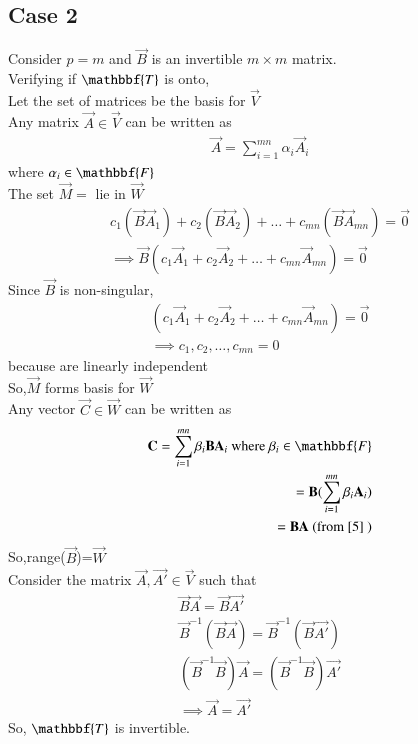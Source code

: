 \documentclass[journal,12pt,twocolumn]{IEEEtran}
\begin{document}
\subsection{Case 2}
 Consider $p=m$ and $\vec{B}$ is an invertible $m \times m$ matrix.\\
Verifying if $\mathbbf{T}$ is onto,\\
Let the set of matrices  be the basis for $\vec{V}$\\
Any matrix $\vec{A} \in \vec{V}$ can be written as
\begin{align}
   \vec{A}= \sum_{i=1}^{mn} \alpha_i\vec{A}_i\label{5}
\end{align}
where $\alpha_i \in \mathbbf{F}$\\
The set $\vec{M}= $  lie in $\vec{W}$
\begin{align}
    c_1(\vec{B}\vec{A}_1)+c_2(\vec{B}\vec{A}_2)+\hdots+c_{mn}(\vec{B}\vec{A}_{mn})=\vec{0}\\
    \implies \vec{B}(c_1\vec{A}_1+c_2\vec{A}_2+\hdots+c_{mn}\vec{A}_{mn})=\vec{0}
\end{align}
Since $\vec{B}$ is non-singular,
\begin{align}
    (c_1\vec{A}_1+c_2\vec{A}_2+\hdots+c_{mn}\vec{A}_{mn})=\vec{0}\\
    \implies c_1,c_2,\hdots,c_{mn}=0
\end{align}
because  are linearly independent\\
So,$\vec{M}$ forms basis for $\vec{W}$\\
Any vector $\vec{C} \in \vec{W}$ can be written as
\begin{align}
    \vec{C}=\sum_{i=1}^{mn} \beta_i\vec{B}\vec{A}_i \text{  where }\beta_i \in \mathbbf{F}\\
    =\vec{B}(\sum_{i=1}^{mn}\beta_i\vec{A}_i)\\
    =\vec{B}\vec{A} \text{  (from \eqref{5} )}
\end{align}
So,range($\vec{B}$)=$\vec{W}$\\
Consider the matrix $\vec{A},\vec{A'} \in \vec{V}$ such that
\begin{align}
    \vec{B}\vec{A}= \vec{B}\vec{A'}\\
    \vec{B}^{-1}( \vec{B}\vec{A})= \vec{B}^{-1}(\vec{B}\vec{A'})\\
    (\vec{B}^{-1} \vec{B})\vec{A}= (\vec{B}^{-1}\vec{B})\vec{A'}\\
    \implies \vec{A}=\vec{A'}
\end{align}
So, $\mathbbf{T}$ is invertible.
\end{document}
